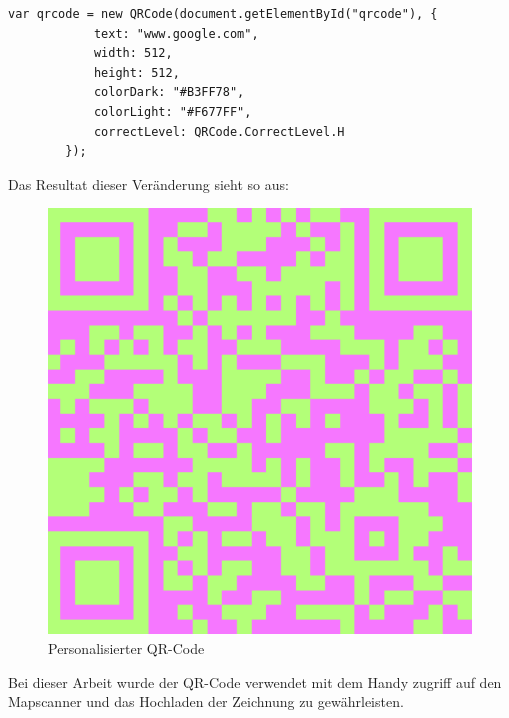 \begin{lstlisting}[language=html,caption=QR-Code Demo 2,label=lst:tech:gaussianBlur]
    var qrcode = new QRCode(document.getElementById("qrcode"), {
            text: "www.google.com",
            width: 512,
            height: 512,
            colorDark: "#B3FF78",
            colorLight: "#F677FF",
            correctLevel: QRCode.CorrectLevel.H
        });
\end{lstlisting}
Das Resultat dieser Veränderung sieht so aus:
\begin{figure}[H]
    \centering
    \includegraphics[scale=0.7]{pics/fancyQR.png}
    \caption{Personalisierter QR-Code}
\end{figure}

Bei dieser Arbeit wurde der QR-Code verwendet mit dem Handy zugriff auf den Mapscanner und
das Hochladen der Zeichnung zu gewährleisten.


